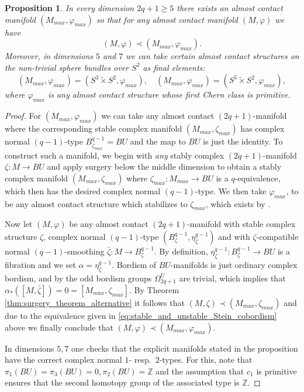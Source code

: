 \documentclass[12pt]{amsart}
\newcommand\Z{\mathbb{Z}}
\newcommand\acs{\varphi}  				%
\newcommand\scxs{\zeta}					%
\newcommand\bscxs{\bar \zeta}			%
\newtheorem{Proposition}[Theorem]{Proposition}
\theoremstyle{remark}
\begin{document}
\begin{Proposition}\label{prop:final_elements}
In every dimension $2q{+} 1 \ge 5$ there exists an almost contact
manifold $(M_{{max}},\varphi_{{max}})$ so that for any almost contact manifold $(M, \varphi  )$ we have
$$(M ,\varphi  ) \prec (M_{{max}},\varphi_{{max}}).$$
 Moreover, in dimensions $5$ and $7$ we can take certain almost contact structures on the non{-}trivial sphere bundles over $S^2$ as final elements:
$$(M_{{max}},\varphi_{{max}}) = (S^3 \tilde \times S^2,\varphi_{{max}}) , \quad (M_{{max}},\varphi_{{max}}) = (S^5 \tilde \times S^2,\varphi_{{max}}),$$
where $\varphi_{{max}}$ is any almost contact structure whose first Chern class is primitive.
\end{Proposition}
\begin{proof}
For $(M_{{max}},\varphi_{{max}})$ we can take any almost contact $(2q{+}1)$-manifold where the corresponding 
stable complex manifold $(M_{{max}},\scxs_{max})$ has complex normal $(q{-}1)$-type $B^{q{-}1}_{\scxs_{max}}= BU$ and the map to $BU$ is just the identity. 
To construct such a manifold, we begin
with {\em any} stably complex $(2q{+}1)$-manifold $\scxs \colon M \to BU$ 
and apply surgery below the middle dimension 
\cite[Proposition 2.6]{BCS2} to obtain a stably complex manifold $(M_{max}, \zeta_{max})$ 
where $\zeta_{max} \colon M_{max} \to BU$ is a $q$-equivalence, which then has the desired complex normal $(q{-}1)$-type. 
We then take $\acs_{max}$, to be any almost contact structure which stabilizes to $\zeta_{max}$, which exists by \cite[Lemma 2.17]{BCS2}.

Now let $(M, \acs)$ be any almost contact $(2q{+}1)$-manifold with stable complex
structure $\zeta$, complex normal $(q{-}1)$-type $(B^{q{-}1}_\zeta, \eta^{q{-}1}_\zeta)$
and with $\zeta$-compatible normal $(q{-}1)$-smoothing $\bscxs \colon M \to B^{q{-}1}_\scxs$.
By definition, $\eta^{q{-}1}_\zeta \colon B^{q{-}1}_\zeta \to BU$ is a fibration and we set
$\alpha = \eta^{q{-}1}_\zeta$. Bordism of $BU$-manifolds is just
ordinary complex bordism, and by \cite[p.117]{Stong1} the
odd bordism groups $\Omega^U_{2q{+}1}$ are trivial, which implies that 
$\alpha_*([M, \bscxs]) = 0 = [M_{max}, \scxs_{max}]$.
By Theorem \ref{thm:surgery_theorem_alternative} it follows that $(M, \scxs) \prec (M_{max}, \scxs_{max})$
and due to the equivalence given in \eqref{eq:stable_and_unstable_Stein_cobordism} above we finally conclude that $(M, \acs) \prec (M_{max}, \acs_{max})$.

In dimensions $5,7$ one checks that the explicit manifolds stated in
the proposition have the correct complex normal $1$-
resp.\ $2$-types. For this, note that $\pi_1(BU) = \pi_3(BU) = 0,
\pi_2(BU) = \Z$ and the assumption that $c_1 $ is primitive ensures
that the second homotopy group of the associated type is $\Z$.
\end{proof}
\end{document}
